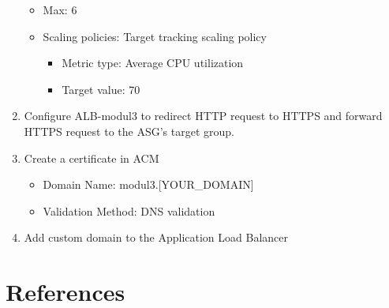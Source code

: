 \documentclass{article}
\begin{document}
\begin{enumerate}
\begin{itemize}
    \item Max: 6
    \item Scaling policies: Target tracking scaling policy
    \begin{itemize}
        \item Metric type: Average CPU utilization
        \item Target value: 70
    \end{itemize}
  \end{itemize}
  \item Configure ALB-modul3 to redirect HTTP request to HTTPS and forward HTTPS request to the ASG's target group.
  \item Create a certificate in ACM
  \begin{itemize}
      \item Domain Name: modul3.[YOUR\_DOMAIN]
      \item Validation Method: DNS validation
  \end{itemize}
  \item Add custom domain to the Application Load Balancer
\end{enumerate}

\section{References}\label{references}
\end{document}
